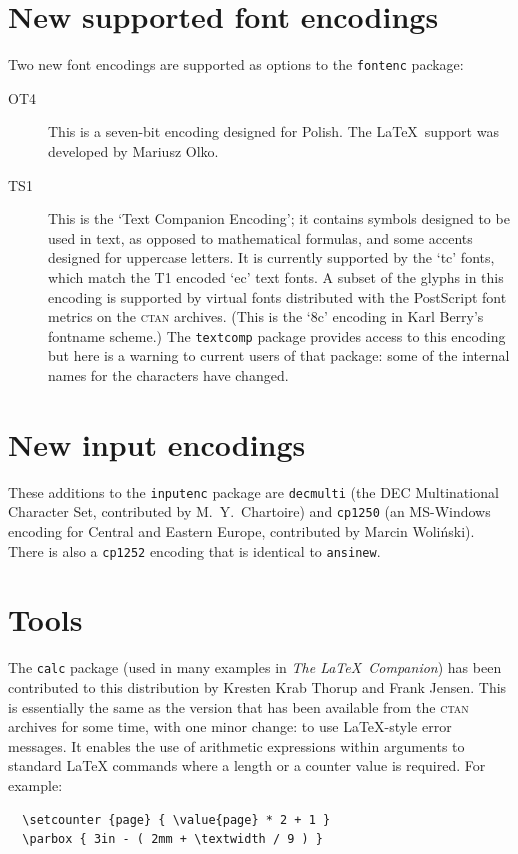 \documentclass{ltnews}
\providecommand\pkg[1]{\texttt{#1}}
\providecommand\option[1]{\texttt{#1}}
\begin{document}
\maketitle

\section{New supported font encodings}

Two  new font encodings are supported as options to the \pkg{fontenc}
package:
\begin{description}
\item [OT4]
This is a seven-bit encoding designed for Polish. The \LaTeX\ support
was developed by Mariusz Olko.
\item [TS1] This is the `Text Companion Encoding'; it contains symbols
designed to be used in text, as opposed to mathematical formulas, and
some accents designed for uppercase letters.  It is currently
supported by the `tc' fonts, which match the T1 encoded `ec' text
fonts.  A subset of the glyphs in this encoding is supported by
virtual fonts distributed with the PostScript font metrics on the
\textsc{ctan} archives. (This is the `8c' encoding in Karl Berry's
fontname scheme.)  The \pkg{textcomp} package provides access to
this encoding but here is a warning to current users of that package:
some of the internal names for the characters have changed.
\end{description}


\section{New input encodings}

These additions to the \pkg{inputenc} package are
\option{decmulti} (the DEC Multinational
Character Set,  contributed by M.~Y.~Chartoire)
and \option{cp1250} (an MS-Windows encoding for Central and Eastern
Europe, contributed by Marcin Woli\'nski).  There is also a
\option{cp1252} encoding that is identical to \option{ansinew}.


\section{Tools}

The \pkg{calc} package (used in many examples in \emph{The \LaTeX\
Companion}) has been contributed to this distribution by Kresten Krab
Thorup and Frank Jensen. This is essentially the same as the version
that has been available from the \textsc{ctan} archives for some time,
with one minor change: to use \LaTeX-style error messages.  It enables
the use of arithmetic expressions within arguments to standard
\LaTeX{} commands where a length or a counter value is required.  For
example:
\begin{verbatim}
  \setcounter {page} { \value{page} * 2 + 1 }
  \parbox { 3in - ( 2mm + \textwidth / 9 ) }
\end{verbatim}
\end{document}

